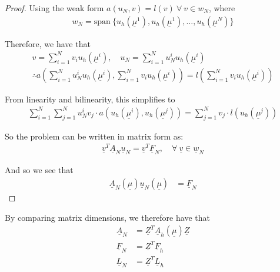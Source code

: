 \begin{enumerate}[label=(\alph*),leftmargin=*,itemsep=0mm]
    \begin{proof}
        
        Using the weak form $a(u_N,v) = l(v) \>\forall\>v\in w_N$, where
        \begin{gather*}
            w_N = \text{span}\> \{ u_h(\underline{\mu}^1), u_h(\underline{\mu}^1), \dots, u_h(\underline{\mu}^N) \}
        \end{gather*}
        
        Therefore, we have that
        \begin{gather*}
            v = \sum_{i=1}^N v_i u_h(\underline{\mu}^i),\quad
            u_N = \sum_{i=1}^N u_N^i u_h(\underline{\mu}^i) \\
            \therefore a \left( \sum_{i=1}^N u_N^i u_h(\underline{\mu}^i),
            \sum_{i=1}^N v_i u_h(\underline{\mu}^i) \right)
            = l\left( \sum_{i=1}^N v_i u_h(\underline{\mu}^i) \right)
        \end{gather*}
        
        From linearity and bilinearity, this simplifies to
        \begin{gather*}
            \sum_{i=1}^N \sum_{j=1}^N u_N^i v_j \cdot a(u_h(\underline{\mu}^i), u_h(\underline{\mu}^j))
            = \sum_{j=1}^N v_j \cdot l(u_h(\underline{\mu}^j))
        \end{gather*}
        
        So the problem can be written in matrix form as:
        \begin{align*}
            \underline{v}^T \underline{A}_N \underline{u}_N 
            = \underline{v}^T \underline{F}_N, \quad
            \forall\>\underline{v} \in \underline{w}_N
        \end{align*}
        
        And so we see that
        \begin{align*}
            \underline{A}_N(\underline{\mu}) \underline{u}_N(\underline{\mu}) &= \underline{F}_N
        \end{align*}
        
    \end{proof}
    
    By comparing matrix dimensions, we therefore have that
    \begin{align}
        \underline{A}_N &= \underline{Z}^T \underline{A}_h(\underline{\mu}) \underline{Z} \\
        \underline{F}_N &= \underline{Z}^T \underline{F}_h \\
        \underline{L}_N &= \underline{Z}^T \underline{L}_h
    \end{align}
    

\end{enumerate}
